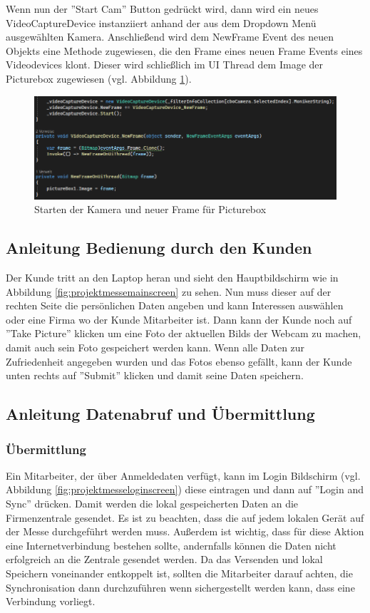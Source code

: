 Wenn nun der ''Start Cam'' Button gedrückt wird, dann wird ein neues VideoCaptureDevice instanziiert anhand der aus dem Dropdown Menü ausgewählten Kamera. Anschließend wird dem NewFrame Event des neuen Objekts eine Methode zugewiesen, die den Frame eines neuen Frame Events eines Videodevices klont. Dieser wird schließlich im UI Thread dem Image der Picturebox zugewiesen (vgl. Abbildung \ref{fig:projektmessewebcam2}).

\begin{figure}[h]
	\centering
	\includegraphics[width=0.9\linewidth]{Images/Projekt_Messe_Webcam2}
	\caption{Starten der Kamera und neuer Frame für Picturebox}
	\label{fig:projektmessewebcam2}
\end{figure}

\newpage
\subsection{Anleitung Bedienung durch den Kunden}
Der Kunde tritt an den Laptop heran und sieht den Hauptbildschirm wie in Abbildung \ref{fig:projektmessemainscreen} zu sehen. Nun muss dieser auf der rechten Seite die persönlichen Daten angeben und kann Interessen auswählen oder eine Firma wo der Kunde Mitarbeiter ist. Dann kann der Kunde noch auf ''Take Picture'' klicken um eine Foto der aktuellen Bilds der Webcam zu machen, damit auch sein Foto gespeichert werden kann. Wenn alle Daten zur Zufriedenheit angegeben wurden und das Fotos ebenso gefällt, kann der Kunde unten rechts auf ''Submit'' klicken und damit seine Daten speichern.

\subsection{Anleitung Datenabruf und Übermittlung}
\subsubsection{Übermittlung}
Ein Mitarbeiter, der über Anmeldedaten verfügt, kann im Login Bildschirm (vgl. Abbildung \ref{fig:projektmesseloginscreen}) diese eintragen und dann auf ''Login and Sync'' drücken. Damit werden die lokal gespeicherten Daten an die Firmenzentrale gesendet. Es ist zu beachten, dass die auf jedem lokalen Gerät auf der Messe durchgeführt werden muss. Außerdem ist wichtig, dass für diese Aktion eine Internetverbindung bestehen sollte, andernfalls können die Daten nicht erfolgreich an die Zentrale gesendet werden. Da das Versenden und lokal Speichern voneinander entkoppelt ist, sollten die Mitarbeiter darauf achten, die Synchronisation dann durchzuführen wenn sichergestellt werden kann, dass eine Verbindung vorliegt.

